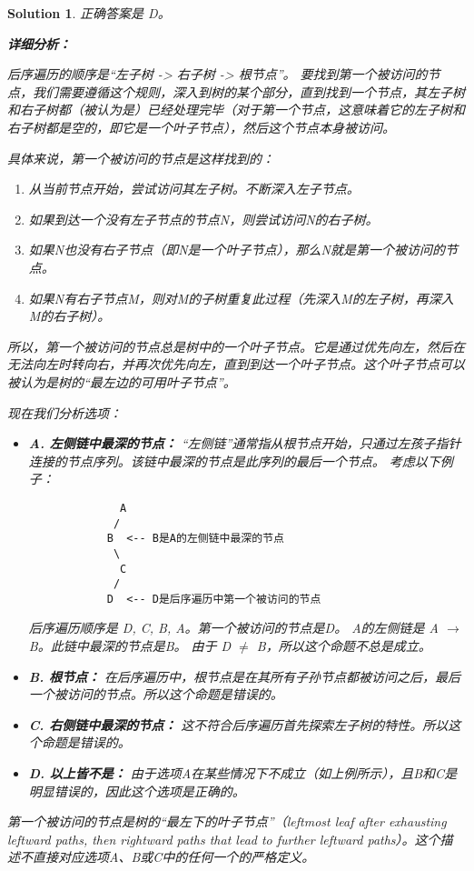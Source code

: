 \documentclass[UTF8]{report}
\newtheorem{solution}{Solution}
\theoremstyle{MyLineTheoremStyle} %
\theoremstyle{MyBlockTheoremStyle} %
\theoremstyle{MySubsubsectionStyle} %
\begin{document}
\begin{solution}
正确答案是 D。

\textbf{详细分析：}

后序遍历的顺序是“左子树 -> 右子树 -> 根节点”。
要找到第一个被访问的节点，我们需要遵循这个规则，深入到树的某个部分，直到找到一个节点，其左子树和右子树都（被认为是）已经处理完毕（对于第一个节点，这意味着它的左子树和右子树都是空的，即它是一个叶子节点），然后这个节点本身被访问。

具体来说，第一个被访问的节点是这样找到的：
\begin{enumerate}
    \item 从当前节点开始，尝试访问其左子树。不断深入左子节点。
    \item 如果到达一个没有左子节点的节点N，则尝试访问N的右子树。
    \item 如果N也没有右子节点（即N是一个叶子节点），那么N就是第一个被访问的节点。
    \item 如果N有右子节点M，则对M的子树重复此过程（先深入M的左子树，再深入M的右子树）。
\end{enumerate}
所以，第一个被访问的节点总是树中的一个叶子节点。它是通过优先向左，然后在无法向左时转向右，并再次优先向左，直到到达一个叶子节点。这个叶子节点可以被认为是树的“最左边的可用叶子节点”。

现在我们分析选项：
\begin{itemize}
    \item \textbf{A. 左侧链中最深的节点：}
        “左侧链”通常指从根节点开始，只通过左孩子指针连接的节点序列。该链中最深的节点是此序列的最后一个节点。
        考虑以下例子：
        \begin{verbatim}
              A
             /
            B  <-- B是A的左侧链中最深的节点
             \
              C
             /
            D  <-- D是后序遍历中第一个被访问的节点
        \end{verbatim}
        后序遍历顺序是 D, C, B, A。第一个被访问的节点是D。
        A的左侧链是 A $\rightarrow$ B。此链中最深的节点是B。
        由于 D $\neq$ B，所以这个命题不总是成立。

    \item \textbf{B. 根节点：}
        在后序遍历中，根节点是在其所有子孙节点都被访问之后，最后一个被访问的节点。所以这个命题是错误的。

    \item \textbf{C. 右侧链中最深的节点：}
        这不符合后序遍历首先探索左子树的特性。所以这个命题是错误的。

    \item \textbf{D. 以上皆不是：}
        由于选项A在某些情况下不成立（如上例所示），且B和C是明显错误的，因此这个选项是正确的。
\end{itemize}

第一个被访问的节点是树的“最左下的叶子节点”（leftmost leaf after exhausting leftward paths, then rightward paths that lead to further leftward paths）。这个描述不直接对应选项A、B或C中的任何一个的严格定义。
\end{solution}
\end{document}
